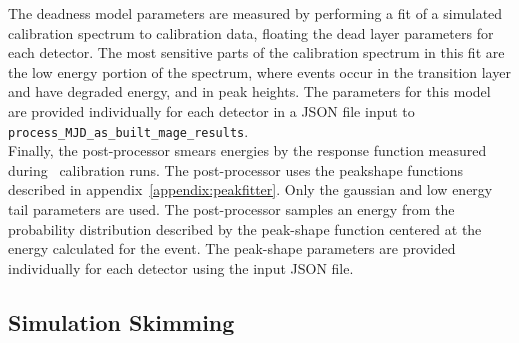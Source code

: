 \documentclass[/main.tex]{subfiles}
\begin{document}
The deadness model parameters are measured by performing a fit of a simulated  calibration spectrum to calibration data, floating the dead layer parameters for each detector.
The most sensitive parts of the calibration spectrum in this fit are the low energy portion of the spectrum, where events occur in the transition layer and have degraded energy, and in peak heights.
The parameters for this model are provided individually for each detector in a JSON file input to \texttt{process\_MJD\_as\_built\_mage\_results}.
\\
Finally, the post-processor smears energies by the response function measured during \ calibration runs.
The post-processor uses the peakshape functions described in appendix~\ref{appendix:peakfitter}.
Only the gaussian and low energy tail parameters are used.
The post-processor samples an energy from the probability distribution described by the peak-shape function centered at the energy calculated for the event.
The peak-shape parameters are provided individually for each detector using the input JSON file.

\subsection{Simulation Skimming}
\end{document}
